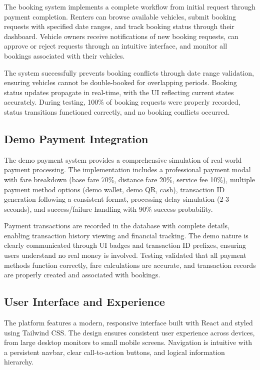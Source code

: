 \documentclass[12pt,a4paper]{report}
\begin{document}
	The booking system implements a complete workflow from initial request through payment completion. Renters can browse available vehicles, submit booking requests with specified date ranges, and track booking status through their dashboard. Vehicle owners receive notifications of new booking requests, can approve or reject requests through an intuitive interface, and monitor all bookings associated with their vehicles.
	
	The system successfully prevents booking conflicts through date range validation, ensuring vehicles cannot be double-booked for overlapping periods. Booking status updates propagate in real-time, with the UI reflecting current states accurately. During testing, 100\% of booking requests were properly recorded, status transitions functioned correctly, and no booking conflicts occurred.
	
	\subsection{Demo Payment Integration}
	
	The demo payment system provides a comprehensive simulation of real-world payment processing. The implementation includes a professional payment modal with fare breakdown (base fare 70\%, distance fare 20\%, service fee 10\%), multiple payment method options (demo wallet, demo QR, cash), transaction ID generation following a consistent format, processing delay simulation (2-3 seconds), and success/failure handling with 90\% success probability.
	
	Payment transactions are recorded in the database with complete details, enabling transaction history viewing and financial tracking. The demo nature is clearly communicated through UI badges and transaction ID prefixes, ensuring users understand no real money is involved. Testing validated that all payment methods function correctly, fare calculations are accurate, and transaction records are properly created and associated with bookings.
	
	\subsection{User Interface and Experience}
	
	The platform features a modern, responsive interface built with React and styled using Tailwind CSS. The design ensures consistent user experience across devices, from large desktop monitors to small mobile screens. Navigation is intuitive with a persistent navbar, clear call-to-action buttons, and logical information hierarchy.
	
\end{document}
